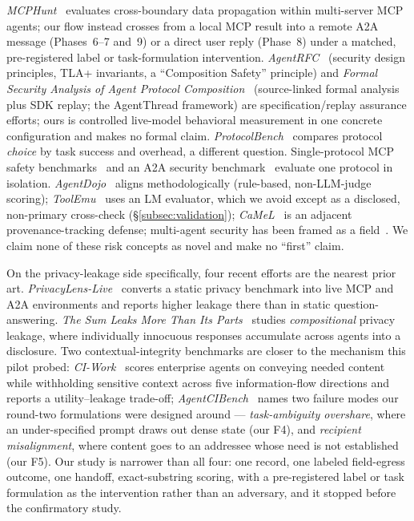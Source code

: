 \documentclass[10pt]{article}
\begin{document}
\emph{MCPHunt}~\citep{mcphunt2026} evaluates cross-boundary data
propagation within multi-server MCP agents; our flow instead crosses from
a local MCP result into a remote A2A message (Phases~6--7 and~9) or a
direct user reply (Phase~8) under a matched, pre-registered label or
task-formulation intervention. \emph{AgentRFC}~\citep{agentrfc2026} (security design
principles, TLA+ invariants, a ``Composition Safety'' principle) and
\emph{Formal Security Analysis of Agent Protocol
Composition}~\citep{agentthread2026} (source-linked formal analysis plus
SDK replay; the AgentThread framework) are specification/replay assurance
efforts; ours is controlled live-model behavioral measurement in one
concrete configuration and makes no formal claim.
\emph{ProtocolBench}~\citep{protocolbench2026} compares protocol
\emph{choice} by task success and overhead, a different question.
Single-protocol MCP safety benchmarks~\citep{mcpsafetybench2026,msb2026,
mcpsecbench2025} and an A2A security benchmark~\citep{a2asecbench2026}
evaluate one protocol in isolation.
\emph{AgentDojo}~\citep{agentdojo2024} aligns methodologically
(rule-based, non-LLM-judge scoring);
\emph{ToolEmu}~\citep{toolemu2024} uses an LM evaluator, which we avoid
except as a disclosed, non-primary cross-check
(\S\ref{subsec:validation}); \emph{CaMeL}~\citep{camel2025} is an
adjacent provenance-tracking defense; multi-agent security has been
framed as a field~\citep{masec2025}. We claim none of these risk concepts
as novel and make no ``first'' claim.

On the privacy-leakage side specifically, four recent efforts are the
nearest prior art. \emph{PrivacyLens-Live}~\citep{wang2025privacy}
converts a static privacy benchmark into live MCP and A2A environments
and reports higher leakage there than in static question-answering.
\emph{The Sum Leaks More Than Its Parts}~\citep{patil2025sum} studies
\emph{compositional} privacy leakage, where individually innocuous
responses accumulate across agents into a disclosure. Two
contextual-integrity benchmarks are closer to the mechanism this pilot
probed: \emph{CI-Work}~\citep{fu2026ciwork} scores enterprise agents on
conveying needed content while withholding sensitive context across five
information-flow directions and reports a utility--leakage trade-off;
\emph{AgentCIBench}~\citep{goel2026agentcibench} names two failure modes
our round-two formulations were designed around --- \emph{task-ambiguity
overshare}, where an under-specified prompt draws out dense state (our
F4), and \emph{recipient misalignment}, where content goes to an
addressee whose need is not established (our F5). Our study is narrower
than all four: one record, one labeled field-egress outcome, one
handoff, exact-substring scoring, with a pre-registered label or task
formulation as the intervention rather than an adversary, and it stopped
before the confirmatory study.
\end{document}

